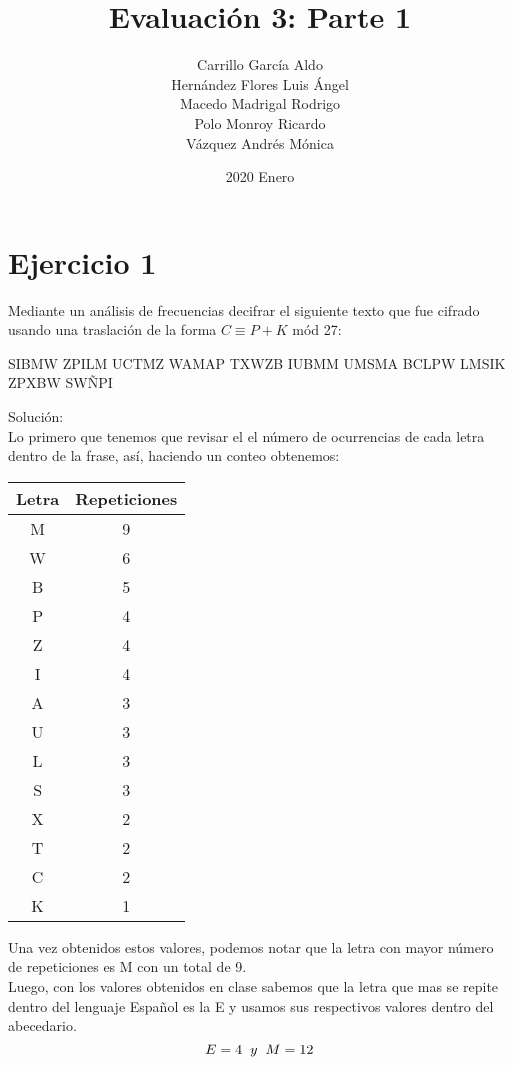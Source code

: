 \documentclass[12pt]{article}
\title{Evaluación 3: Parte 1}
\date{2020 Enero}
\author{Carrillo García Aldo \\ Hernández Flores Luis Ángel \\ Macedo Madrigal Rodrigo \\ Polo Monroy Ricardo \\ Vázquez Andrés Mónica}
\begin{document}
\maketitle
\section{Ejercicio 1}
\par Mediante un análisis de frecuencias decifrar el siguiente texto que fue cifrado usando una traslación de la forma $C \equiv P + K$  mód 27: 
\begin{center}
    SIBMW ZPILM UCTMZ WAMAP TXWZB IUBMM UMSMA BCLPW LMSIK ZPXBW SWÑPI
\end{center}

\par Solución: \\
Lo primero que tenemos que revisar el el número de ocurrencias de cada letra dentro de la frase, así, haciendo un conteo obtenemos: 

\begin{center}
    \begin{tabular}{ |c|c|}
        \hline
            Letra & Repeticiones \\
        \hline
        M & 9 \\
        W & 6 \\
        B & 5 \\
        P & 4 \\
        Z & 4 \\
        I & 4 \\
        A & 3 \\
        U & 3 \\
        L & 3 \\
        S & 3 \\
        X & 2 \\ 
        T & 2 \\ 
        C & 2 \\ 
        K & 1 \\
        \hline
    \end{tabular}
\end{center}

Una vez obtenidos estos valores, podemos notar que la letra con mayor número de repeticiones es M con un total de 9. \\
Luego, con los valores obtenidos en clase sabemos que la letra que mas se repite dentro del lenguaje Español es la E y usamos sus respectivos valores dentro del abecedario.
\begin{equation}
    E = 4 \hspace{0.2cm} y \hspace{0.2cm} M = 12
\end{equation}
\end{document}
